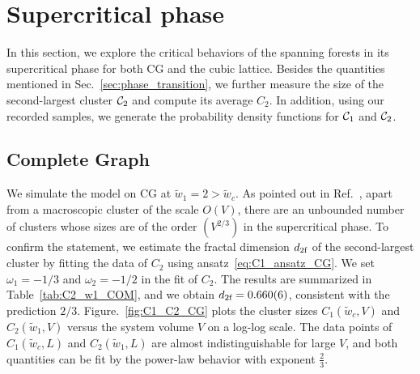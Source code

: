 \section{Supercritical phase}
In this section, we explore the critical behaviors of the spanning forests in its supercritical phase for both CG and the cubic lattice.
Besides the quantities mentioned in Sec.~\ref{sec:phase_transition}, we further measure the size of the second-largest cluster ${\mathcal C}_2$ and 
compute its average $C_2$.
In addition, using our recorded samples, we generate the probability density functions for ${\mathcal C}_1$ and ${\mathcal C}_2$.

\subsection{Complete Graph}


We simulate the model on CG at $\tilde{w}_1 = 2 > \tilde{w}_c$. As pointed out in Ref.~, apart from
a macroscopic cluster of the scale $O(V)$, there are an unbounded number of clusters whose sizes are of the order $(V^{2/3})$ in the
supercritical phase. To confirm the statement, we estimate the fractal dimension ${d_{2\textrm{f}}}$ of the second-largest cluster by fitting the data of $C_2$ using ansatz~\eqref{eq:C1_ansatz_CG}.
We set $\omega_1 = -1/3$ and $\omega_2 = -1/2$ in the fit of $C_2$. The results are summarized in Table~\ref{tab:C2_w1_COM}, and we obtain ${d_{2\textrm{f}}} = 0.660(6)$, 
consistent with the prediction $2/3$. Figure.~\ref{fig:C1_C2_CG} plots the cluster sizes $C_1(\tilde{w}_c, V)$ and $C_2(\tilde{w}_1, V)$ versus the system volume
$V$ on a log-log scale. The data points of $C_1(\tilde{w}_c, L)$ and $C_2(\tilde{w}_1, L)$ are almost indistinguishable for large $V$, and both quantities
can be fit by the power-law behavior with exponent $\frac{2}{3}$.

